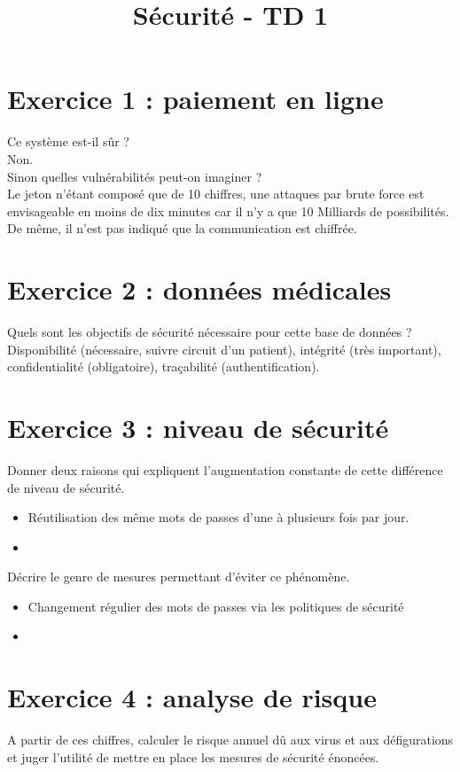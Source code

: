 \documentclass[11pt,a4paper]{article}
\title{Sécurité - TD 1}
\begin{document}
	
	\maketitle
	
	\section{Exercice 1 : paiement en ligne}
	
	Ce système est-il sûr ?\\
	Non.\\
	
	Sinon quelles vulnérabilités peut-on imaginer ?\\
	Le jeton n'étant composé que de 10 chiffres, une attaques par brute force est envisageable en moins de dix minutes car il n'y a que 10 Milliards de possibilités. De même, il n'est pas indiqué que la communication est chiffrée.
	
	\section{Exercice 2 : données médicales}
	
	Quels sont les objectifs de sécurité nécessaire pour cette base de données ?\\
	Disponibilité (nécessaire, suivre circuit d'un patient), intégrité (très important), confidentialité (obligatoire), traçabilité (authentification).\\
	
	\section{Exercice 3 : niveau de sécurité}
	Donner deux raisons qui expliquent l'augmentation constante de cette différence de niveau de sécurité.\\
	\begin{itemize}
		\item Réutilisation des même mots de passes d'une à plusieurs fois par jour.
		\item 
	\end{itemize}

	Décrire le genre de mesures permettant d'éviter ce phénomène.\\
	\begin{itemize}
		\item Changement régulier des mots de passes via les politiques de sécurité
		\item 
	\end{itemize}

	\section{Exercice 4 : analyse de risque}
	
	A partir de ces chiffres, calculer le risque annuel dû aux virus et aux défigurations et juger l'utilité de mettre en place les mesures de sécurité énoncées.\\
	
\end{document}
